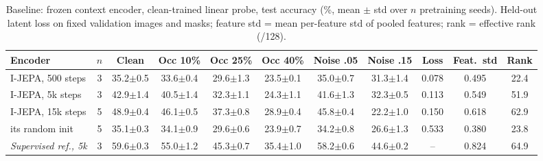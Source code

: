 \begin{table}[t]\centering\small\setlength{\tabcolsep}{3.5pt}
\caption{Baseline: frozen context encoder, clean-trained linear probe, test accuracy (\%, mean $\pm$ std over $n$ pretraining seeds). Held-out latent loss on fixed validation images and masks; feature std = mean per-feature std of pooled features; rank = effective rank (/128).}
\label{tab:baseline}
\begin{tabular}{lcccccccccc}\toprule
Encoder & $n$ & Clean & Occ 10\% & Occ 25\% & Occ 40\% & Noise .05 & Noise .15 & Loss & Feat.\ std & Rank \\\midrule
I-JEPA, 500 steps & 3 & 35.2{\scriptsize$\pm$0.5} & 33.6{\scriptsize$\pm$0.4} & 29.6{\scriptsize$\pm$1.3} & 23.5{\scriptsize$\pm$0.1} & 35.0{\scriptsize$\pm$0.7} & 31.3{\scriptsize$\pm$1.4} & 0.078 & 0.495 & 22.4 \\
I-JEPA, 5k steps & 3 & 42.9{\scriptsize$\pm$1.4} & 40.5{\scriptsize$\pm$1.4} & 32.3{\scriptsize$\pm$1.1} & 24.3{\scriptsize$\pm$1.1} & 41.6{\scriptsize$\pm$1.3} & 32.3{\scriptsize$\pm$0.5} & 0.113 & 0.549 & 51.9 \\
I-JEPA, 15k steps & 5 & 48.9{\scriptsize$\pm$0.4} & 46.1{\scriptsize$\pm$0.5} & 37.3{\scriptsize$\pm$0.8} & 28.9{\scriptsize$\pm$0.4} & 45.8{\scriptsize$\pm$0.4} & 22.2{\scriptsize$\pm$1.0} & 0.150 & 0.618 & 62.9 \\
\quad its random init & 5 & 35.1{\scriptsize$\pm$0.3} & 34.1{\scriptsize$\pm$0.9} & 29.6{\scriptsize$\pm$0.6} & 23.9{\scriptsize$\pm$0.7} & 34.2{\scriptsize$\pm$0.8} & 26.6{\scriptsize$\pm$1.3} & 0.533 & 0.380 & 23.8 \\
\midrule
\textit{Supervised ref., 5k} & 3 & 59.6{\scriptsize$\pm$0.3} & 55.0{\scriptsize$\pm$1.2} & 45.3{\scriptsize$\pm$0.7} & 35.4{\scriptsize$\pm$1.0} & 58.2{\scriptsize$\pm$0.6} & 44.6{\scriptsize$\pm$0.2} & -- & 0.824 & 64.9 \\
\bottomrule\end{tabular}\end{table}
